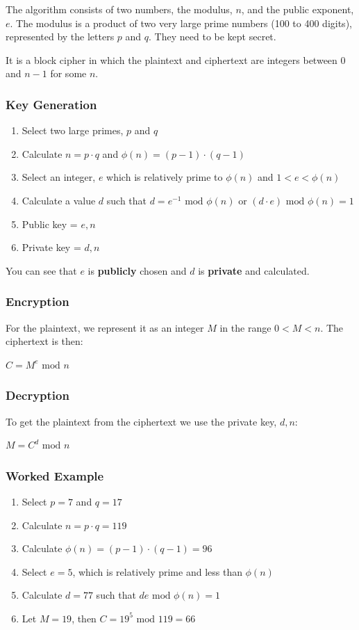 \documentclass{article}
\newcommand{\Mod}[1]{\text{ mod }#1}
\begin{document}
The algorithm consists of two numbers, the modulus, $n$, and the public exponent, $e$. The modulus is a product of two very large prime numbers (100 to 400 digits), represented by the letters $p$ and $q$. They need to be kept secret.

It is a block cipher in which the plaintext and ciphertext are integers between 0 and $n-1$ for some $n$.

\subsubsection{Key Generation}
\begin{enumerate}
	\item Select two large primes, $p$ and $q$
	\item Calculate $n = p \cdot q$ and $\phi(n) = (p-1) \cdot (q-1)$
	\item Select an integer, $e$ which is relatively prime to $\phi(n)$ and $1 < e < \phi(n)$
	\item Calculate a value $d$ such that $d = e^{-1} \Mod \phi(n)$ or $(d \cdot e) \Mod \phi(n) = 1$
	\item Public key = ${e, n}$
	\item Private key = ${d, n}$
\end{enumerate}
You can see that $e$ is \textbf{publicly} chosen and $d$ is \textbf{private} and calculated.

\subsubsection{Encryption}
For the plaintext, we represent it as an integer $M$ in the range $0 < M < n$. The ciphertext is then:
\begin{center}
	$C = M^{e} \Mod n$
\end{center}

\subsubsection{Decryption}
To get the plaintext from the ciphertext we use the private key, ${d, n}$:
\begin{center}
	$M = C^{d} \Mod n$
\end{center}

\subsubsection{Worked Example}
\begin{enumerate}
	\item Select $p=7$ and $q=17$
	\item Calculate $n = p \cdot q = 119$
	\item Calculate $\phi(n) = (p-1) \cdot (q-1) = 96$
	\item Select $e = 5$, which is relatively prime and less than $\phi(n)$
	\item Calculate $d=77$ such that $de \Mod \phi(n) = 1$
	\item Let $M = 19$, then $C = 19^{5} \Mod 119 = 66$
\end{enumerate}
\end{document}
